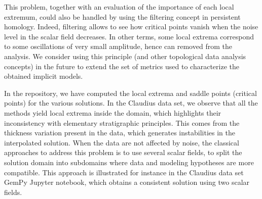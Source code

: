 \documentclass[preprint]{ring20}
\begin{document}
This problem, together with an evaluation of the importance of each local extremum, could also be handled by using the filtering concept in persistent homology. Indeed, filtering allows to see how critical points vanish when the noise level in the scalar field decreases. In other terms, some local extrema correspond to some oscillations of very small amplitude, hence can removed from the analysis. We consider using this principle (and other topological data analysis concepts) in the future to extend the set of metrics used to characterize the obtained implicit models. 

In the repository, we have computed the local extrema and saddle points (critical points) for the various solutions. In the Claudius data set, we observe that all the methods yield local extrema inside the domain, which highlights their inconsistency with elementary stratigraphic principles. This comes from the thickness variation present in the data, which generates instabilities in the interpolated solution. When the data are not affected by noise, the classical approaches to address this problem is to use several scalar fields, to split the solution domain into subdomains where data and modeling hypotheses are more compatible. This approach is illustrated for instance in the Claudius data set GemPy Jupyter notebook, which obtains a consistent solution using two scalar fields. 


 
\end{document}
